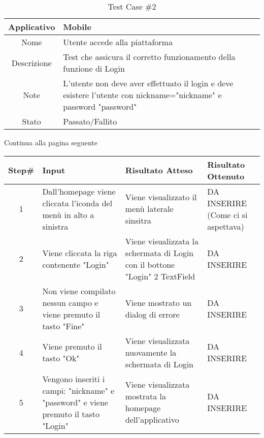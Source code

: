 
\begin{table}[H]
    \centering
    \footnotesize
    \caption{Test Case \#2}
    \begin{tabularx}{\textwidth}{|c|X|}
        \hline
        Applicativo & Mobile\\
        \hline
        Nome & Utente accede alla piattaforma  \\
        \hline
        Descrizione & Test che assicura il corretto funzionamento della funzione di Login\\
        \hline
        Note &  L'utente non deve aver effettuato il login e deve esistere l'utente
        con nickname="nickname" e password "password"\\
        \hline
        Stato & Passato/Fallito\\
        \hline

    \end{tabularx}
    Continua alla pagina seguente
    \setlength{\tabcolsep}{8pt}
    \renewcommand{\arraystretch}{1.5}
\end{table}
\begin{table}[H]
    \footnotesize
    \begin{tabularx}{\textwidth}{|c|X|X|X|}
        \hline
        Step\# & Input & Risultato Atteso & Risultato Ottenuto \\
        \hline
         1 & Dall'homepage viene cliccata l'iconda del menù in alto a sinistra 
         & Viene visualizzato il menù laterale sinsitra
         &DA INSERIRE (Come ci si aspettava)\\
          \hline
        2 & Viene cliccata la riga contenente "Login"
        & Viene visualizzata la schermata di Login con il bottone "Login" 2 TextField
        & DA INSERIRE\\
         \hline 
        3 & Non viene compilato nessun campo e viene premuto il tasto "Fine"
         & Viene mostrato un dialog di errore & DA INSERIRE\\
          \hline
        4 & Viene premuto il tasto "Ok"
         & Viene visualizzata nuovamente la schermata di Login
         & DA INSERIRE\\
          \hline 
          5 & Vengono inseriti i campi: "nickname" e "password" e viene premuto il tasto "Login"
         & Viene visualizzata mostrata la homepage dell'applicativo
         & DA INSERIRE\\
          \hline           
    \end{tabularx}
\end{table}
    
       
